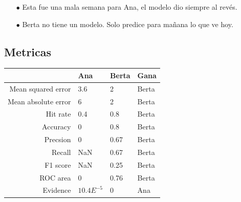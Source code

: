 \documentclass[shownotes]{beamer}
\begin{document}
\begin{frame}
\begin{itemize}
\footnotesize
 \item[$\bullet$] Esta fue una mala semana para Ana, el modelo dio siempre al rev\'es.
 \item[$\bullet$] Berta no tiene un modelo. Solo predice para mañana lo que ve hoy.
\end{itemize}

\end{frame}

\subsection{Metricas}

\begin{frame}
\begin{table}[H]
\centering
\begin{tabular}{rlll}
  \hline
 & Ana & Berta & Gana \\ 
  \hline
Mean squared error & 3.6 & 2 & Berta \\ 
  Mean absolute error & 6 & 2 & Berta \\ 
  Hit rate & 0.4 & 0.8 & Berta \\ 
  Accuracy & 0 & 0.8 & Berta \\ 
  Precsion & 0 & 0.67 & Berta \\ 
  Recall & NaN & 0.67 & Berta \\ 
  F1 score & NaN & 0.25 & Berta \\ 
  ROC area & 0 & 0.76 & Berta \\ 
  Evidence & $10.4E^{-5}$ & 0 & Ana \\ 
   \hline
\end{tabular}
\end{table}


\end{frame}
\end{document}
